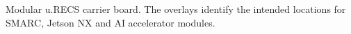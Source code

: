 Modular u.RECS carrier board. The overlays identify the intended locations for SMARC, Jetson NX and AI accelerator modules.
